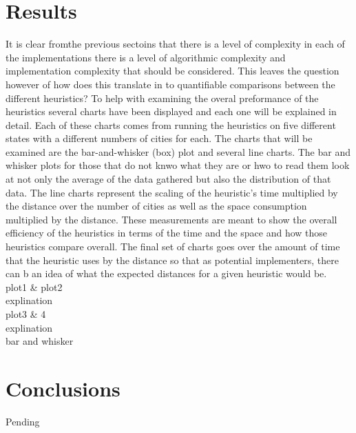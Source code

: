\documentclass[midd]{thesis}
\newcommand{\tab}{\hspace*{2em}}
\begin{document}
\chapter{Results}
\tab It is clear fromthe previous sectoins that there is a level of complexity in each of the implementations there is a level of algorithmic complexity and implementation complexity that should be considered. This leaves the question however of how does this translate in to quantifiable comparisons between the different heuristics? To help with examining the overal preformance of the heuristics several charts have been displayed and each one will be explained in detail. Each of these charts comes from running the heuristics on five different states with a different numbers of cities for each. The charts that will be examined are the bar-and-whisker (box) plot and several line charts. The bar and whisker plots for those that do not knwo what they are or hwo to read them look at not only the average of the data gathered but also the distribution of that data. The line charts represent the scaling of the heuristic's time multiplied by the distance over the number of cities as well as the space consumption multiplied by the distance. These measurements are meant to show the overall efficiency of the heuristics in terms of the time and the space and how those heuristics compare overall. The final set of charts goes over the amount of time that the heuristic uses by the distance so that as potential implementers, there can b an idea of what the expected distances for a given heuristic would be.\\
plot1 & plot2\\
explination\\
plot3 & 4\\
explination\\
bar and whisker\\
\chapter{Conclusions}
Pending\\

\end{document}
